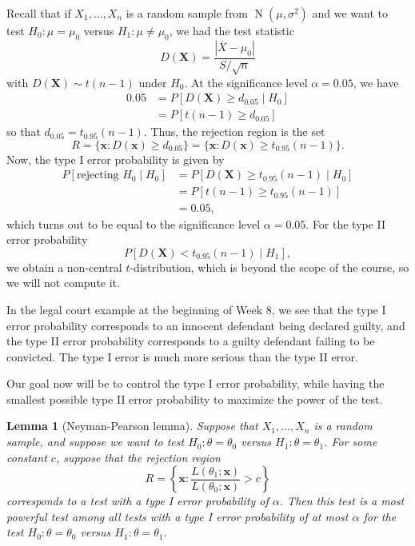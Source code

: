 \documentclass[10pt]{article}
\DeclareMathOperator{\Nor}{N}
\theoremstyle{newstyle}
\newtheorem{lemma}[thm]{Lemma}
\begin{document}
Recall that if $X_1, \dots, X_n$ is a random sample from $\Nor(\mu, \sigma^2)$ and we want to test 
$H_0 : \mu = \mu_0$ versus $H_1 : \mu \neq \mu_0$, we had the test statistic 
\[ D(\mathbf X) = \frac{|\overline{X} - \mu_0|}{S/\sqrt n} \]
with $D(\mathbf X) \sim t(n-1)$ under $H_0$. At the significance level $\alpha = 0.05$, we have 
\begin{align*}
    0.05 &= P[D(\mathbf X) \geq d_{0.05} \mid H_0] \\
    &= P[t(n-1) \geq d_{0.05}]
\end{align*}
so that $d_{0.05} = t_{0.95}(n-1)$. Thus, the rejection region is the set 
\[ R = \{\mathbf x : D(\mathbf x) \geq d_{0.05}\} = \{\mathbf x : D(\mathbf x) \geq t_{0.95}(n-1)\}. \]
Now, the type I error probability is given by 
\begin{align*}
    P[\text{rejecting } H_0 \mid H_0] 
    &= P[D(\mathbf X) \geq t_{0.95}(n-1) \mid H_0] \\
    &= P[t(n-1) \geq t_{0.95}(n-1)] \\
    &= 0.05,
\end{align*}
which turns out to be equal to the significance level $\alpha = 0.05$. For the 
type II error probability 
\[ P[D(\mathbf X) < t_{0.95}(n-1) \mid H_1], \]
we obtain a non-central $t$-distribution, which is beyond the scope of the course, so we will 
not compute it. 

In the legal court example at the beginning of Week 8, we see that the type I error probability 
corresponds to an innocent defendant being declared guilty, and the type II error 
probability corresponds to a guilty defendant failing to be convicted. The 
type I error is much more serious than the type II error. 

Our goal now will be to control the type I error probability, while having the smallest 
possible type II error probability to maximize the power of the test. 

\begin{lemma}[Neyman-Pearson lemma]
Suppose that $X_1, \dots, X_n$ is a random sample, and suppose we want to test 
$H_0 : \theta = \theta_0$ versus $H_1 : \theta = \theta_1$. 
For some constant $c$, suppose that the rejection region 
\[ R = \left\{ \mathbf x : \frac{L(\theta_1; \mathbf x)}{L(\theta_0; \mathbf x)} > c \right\} \]
corresponds to a test with a type I error probability of $\alpha$. Then this test is a 
most powerful test among all tests with a type I error probability of at most $\alpha$ for 
the test $H_0 : \theta = \theta_0$ versus $H_1 : \theta = \theta_1$.
\end{lemma}
\end{document}

